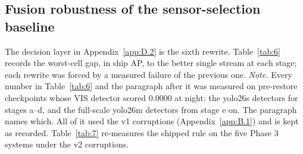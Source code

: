 \documentclass[journal,onecolumn]{IEEEtran}
\begin{document}
\subsection{Fusion robustness of the sensor-selection baseline}\label{app:D.3}
The decision layer in Appendix~\ref{app:D.2} is the sixth rewrite. Table~\ref{tab:6} records the worst-cell gap, in ship AP, to the better single stream at each stage; each rewrite was forced by a measured failure of the previous one. \emph{Note.} Every number in Table~\ref{tab:6} and the paragraph after it was measured on pre-restore checkpoints whose VIS detector scored 0.0000 at night: the yolo26s detectors for stages a--d, and the full-scale yolo26m detectors from stage e on. The paragraph names which. All of it used the v1 corruptions (Appendix~\ref{app:B.1}) and is kept as recorded. Table~\ref{tab:7} re-measures the shipped rule on the five Phase 3 systems under the v2 corruptions.
\end{document}
